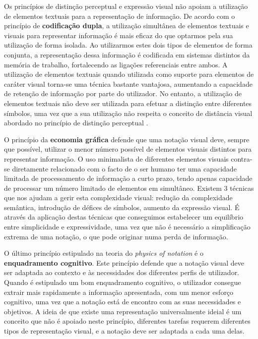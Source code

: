 Os princípios de distinção perceptual e expressão visual não apoiam a utilização de elementos textuais para a representação de informação. De acordo com o princípio de \textbf{codificação dupla}, a utilização simultânea de elementos textuais e visuais para representar informação é mais eficaz do que optarmos pela sua utilização de forma isolada. Ao utilizarmos estes dois tipos de elementos de forma conjunta, a representação dessa informação é codificada em sistemas distintos da memória de trabalho, fortalecendo as ligações referenciais entre ambos. A utilização de elementos textuais quando utilizada como suporte para elementos de caráter visual torna-se uma técnica bastante vantajosa, aumentando a capacidade de retenção de informação por parte do utilizador. No entanto, a utilização de elementos textuais não deve ser utilizada para efetuar a distinção entre diferentes símbolos, uma vez que a sua utilização não respeita o conceito de distância visual abordado no princípio de distinção perceptual \cite{moody2009physics}. 

O princípio da \textbf{economia gráfica} defende que uma notação visual deve, sempre que possível, utilizar o menor número possível de elementos visuais distintos para representar informação. O uso minimalista de diferentes elementos visuais contra-se diretamente relacionado com o facto de o ser humano ter uma capacidade limitada de processamento de informação a curto prazo, tendo apenas capacidade de processar um número limitado de elementos em simultâneo. Existem 3 técnicas que nos ajudam a gerir esta complexidade visual: redução da complexidade semântica, introdução de défices de símbolos, aumento da expressão visual. É através da aplicação destas técnicas que conseguimos estabelecer um equilíbrio entre simplicidade e expressividade, uma vez que não é necessário a simplificação extrema de uma notação, o que pode originar numa perda de informação.

O último princípio estipulado na teoria do \textit{physics of notation} é o \textbf{enquadramento cognitivo}. Este princípio defende que a notação visual deve ser adaptada ao contexto e às necessidades dos diferentes perfis de utilizador. Quando é estipulado um bom enquadramento cognitivo, o utilizador consegue extrair mais rapidamente a informação apresentada, com um menor esforço cognitivo, uma vez que a notação está de encontro com as suas necessidades e objetivos. A ideia de que existe uma representação universalmente ideial é um conceito que não é apoiado neste princípio, diferentes tarefas requerem diferentes tipos de representação visual, e a notação deve ser adaptada a cada uma delas. 

